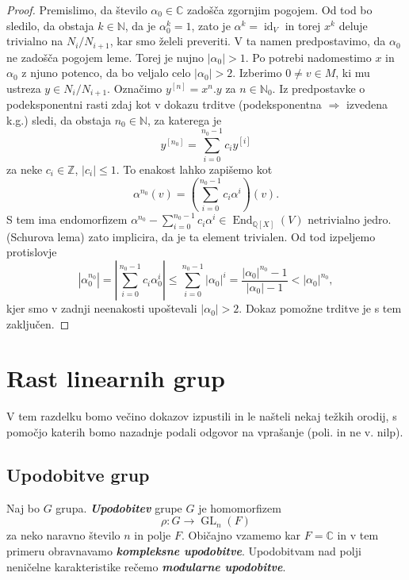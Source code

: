 \documentclass[11pt]{book}
\def\NN{\mathbb{N}}
\def\ZZ{\mathbb{Z}}
\def\QQ{\mathbb{Q}}
\def\CC{\mathbb{C}}
\DeclareMathOperator\GL{GL}
\DeclareMathOperator\id{id}
\DeclareMathOperator\End{End}
\def\definicija{\color{rdeca}\bf\em}
\def\vprasanje{\color{oranzna}}
\theoremstyle{definition}
\theoremstyle{zgled}
\theoremstyle{odprtproblem}
\theoremstyle{domacanaloga}
\newenvironment{dokaz}
    {\color{siva}\begin{proof}}
    {\end{proof}}
\theoremstyle{izrek}
\begin{document}
\begin{dokaz}
Premislimo, da število $\alpha_0 \in \CC$ zadošča zgornjim pogojem. Od tod bo sledilo, da obstaja $k \in \NN$, da je $\alpha_0^k = 1$, zato je $\alpha^k = \id_V$ in torej $x^k$ deluje trivialno na $N_i/N_{i+1}$, kar smo želeli preveriti. V ta namen predpostavimo, da $\alpha_0$ ne zadošča pogojem leme. Torej je nujno $|\alpha_0| > 1$. Po potrebi nadomestimo $x$ in $\alpha_0$ z njuno potenco, da bo veljalo celo $|\alpha_0| > 2$. Izberimo $0 \neq v \in M$, ki mu ustreza $y \in N_i/N_{i+1}$. Označimo $y^{[n]} = x^n.y$ za $n \in \NN_0$. Iz predpostavke o podeksponentni rasti zdaj kot v dokazu trditve {\sc (podeksponentna $\Rightarrow$ izvedena k.g.)} sledi, da obstaja $n_0 \in \NN$, za katerega je
\[
y^{[n_0]} = \sum_{i = 0}^{n_0 - 1} c_i y^{[i]}
\]
za neke $c_i \in \ZZ$, $|c_i| \leq 1$. To enakost lahko zapišemo kot
\[
\alpha^{n_0}(v) = \left( \sum_{i = 0}^{n_0 - 1} c_i \alpha^i \right)(v).
\]
S tem ima endomorfizem $\alpha^{n_0} - \sum_{i = 0}^{n_0 - 1} c_i \alpha^i \in \End_{\QQ[X]}(V)$ netrivialno jedro. {\sc (Schurova lema)} zato implicira, da je ta element trivialen. Od tod izpeljemo protislovje
\[
|\alpha_0^{n_0}| = \left| \sum_{i = 0}^{n_0 - 1} c_i \alpha_0^i \right|
\leq \sum_{i = 0}^{n_0 - 1} |\alpha_0|^i = \frac{|\alpha_0|^{n_0} - 1}{|\alpha_0| - 1} < |\alpha_0|^{n_0},
\]
kjer smo v zadnji neenakosti upoštevali $|\alpha_0| > 2$. Dokaz pomožne trditve je s tem zaključen.
\end{dokaz}

\section{Rast linearnih grup}

V tem razdelku bomo večino dokazov izpustili in le našteli nekaj težkih orodij, s pomočjo katerih bomo nazadnje podali odgovor na vprašanje {\vprasanje \sc (poli. in ne v. nilp)}.

\subsection{Upodobitve grup}

Naj bo $G$ grupa. {\definicija Upodobitev} grupe $G$ je homomorfizem
\[
\rho \colon G \to \GL_n(F)
\]
za neko naravno število $n$ in polje $F$. Običajno vzamemo kar $F = \CC$ in v tem primeru obravnavamo {\definicija kompleksne upodobitve}. Upodobitvam nad polji neničelne karakteristike rečemo {\definicija modularne upodobitve}.
\end{document}
